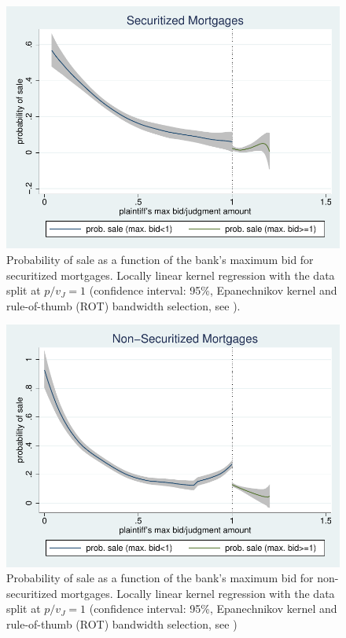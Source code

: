 \documentclass[11pt,twopage]{article}
\begin{document}
\begin{figure}[tbp]
  \centering
  \includegraphics[width=0.6
  \textwidth]{graphics/discontinuity_securitized}
  \caption{Probability of sale as a function of the bank's maximum bid
    for securitized mortgages. Locally linear kernel regression with
    the data split at $p/v_J=1$ (confidence interval: 95\%,
    Epanechnikov kernel and rule-of-thumb (ROT) bandwidth selection,
    see \cite{fan1996local}).}
  \label{fig:probability-of-sale-securitized}
\end{figure}

\begin{figure}[tbp]
  \centering
  \includegraphics[width=0.6
  \textwidth]{graphics/discontinuity_nonsecuritized}
  \caption{Probability of sale as a function of the bank's maximum bid
    for non-securitized mortgages. Locally linear kernel regression
    with the data split at $p/v_J=1$ (confidence interval: 95\%,
    Epanechnikov kernel and rule-of-thumb (ROT) bandwidth selection,
    see \cite{fan1996local})}
  \label{fig:probability-of-sale-nonsecuritized}
\end{figure}
\end{document}

